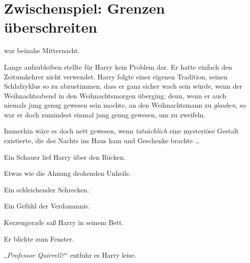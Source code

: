 \chapter{Zwischenspiel: Grenzen überschreiten}

 war beinahe Mitternacht.

\hplettrineextrapara
Lange aufzubleiben stellte für Harry kein Problem dar. Er hatte einfach den Zeitumkehrer nicht verwendet. Harry folgte einer eigenen Tradition, seinen Schlafzyklus so zu abzustimmen, dass er ganz sicher wach sein würde, wenn der Weihnachtsabend in den Weihnachtsmorgen überging; denn, wenn er auch niemals jung genug gewesen sein mochte, an den Weihnachtsmann zu \emph{glauben}, so war er doch zumindest einmal jung genug gewesen, um zu zweifeln.

Immerhin wäre es doch nett gewesen, wenn \emph{tatsächlich} eine mysteriöse Gestalt existierte, die des Nachts ins Haus kam und Geschenke brachte …

Ein Schauer lief Harry über den Rücken.

Etwas wie die Ahnung drohenden Unheils.

Ein schleichender Schrecken.

Ein Gefühl der Verdammnis.

Kerzengerade saß Harry in seinem Bett.

Er blickte zum Fenster.

„\emph{Professor Quirrell?}“ entfuhr es Harry leise.

